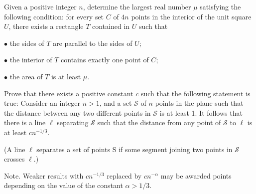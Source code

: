 \documentclass[11pt]{scrartcl}
\begin{document}
\begin{problem} [RMM 2015/6]
    Given a positive integer $n$, determine the largest real number $\mu$ satisfying the following condition: for every set $C$ of $4n$ points in the interior of the unit square $U$, there exists a rectangle $T$ contained in $U$ such that

$\bullet$ the sides of $T$ are parallel to the sides of $U$;

$\bullet$ the interior of $T$ contains exactly one point of $C$;

$\bullet$ the area of $T$ is at least $\mu$.
\end{problem}

\begin{problem} [IMO 2020/6]
    Prove that there exists a positive constant $c$ such that the following statement is true:
Consider an integer $n > 1$, and a set $\mathcal S$ of $n$ points in the plane such that the distance between any two different points in $\mathcal S$ is at least 1. It follows that there is a line $\ell$ separating $\mathcal S$ such that the distance from any point of $\mathcal S$ to $\ell$ is at least $cn^{-1/3}$.

(A line $\ell$ separates a set of points S if some segment joining two points in $\mathcal S$ crosses $\ell$.)

Note. Weaker results with $cn^{-1/3}$ replaced by $cn^{-\alpha}$ may be awarded points depending on the value of the constant $\alpha > 1/3$.
\end{problem}
\end{document}
